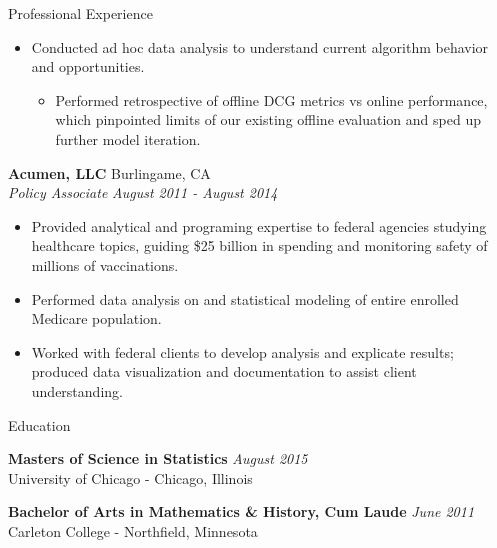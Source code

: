 \documentclass{resume} %
\begin{document}
\begin{rSection}{Professional Experience}
\begin{itemize}
\begin{itemize}
        \end{itemize}
    \item Conducted ad hoc data analysis to understand current algorithm behavior and opportunities.
        \vspace{-0.2em}
        \begin{itemize} \itemsep -0.2em
            \item Performed retrospective of offline DCG metrics vs online performance, which pinpointed limits of our existing offline evaluation and sped up further model iteration.
        \end{itemize}

\end{itemize}


{\bf Acumen, LLC} \hfill Burlingame, CA \\
{\em Policy Associate} \hfill {\em August 2011 - August 2014} \vspace{0.3em} 
\vspace{-0.2em}
\begin{itemize} \itemsep -0.2em
    \item Provided analytical and programing expertise to federal agencies studying healthcare  topics, guiding \$25 billion in spending and monitoring safety of millions of vaccinations.
    \item Performed data analysis on and statistical modeling of entire enrolled Medicare population.
    \item Worked with federal clients to develop analysis and explicate results; produced data visualization and documentation to assist client understanding. 
\end{itemize}
\end{rSection}

\vspace{0.4em}

\begin{rSection}{Education}

    {\bf Masters of Science in Statistics} \hfill {\em August 2015} \\
    University of Chicago - Chicago, Illinois \\
    \vspace{-1.2em}

    {\bf Bachelor of Arts in Mathematics \& History, Cum Laude} \hfill {\em June 2011} \\ 
    Carleton College - Northfield, Minnesota  \\
\end{rSection}
\end{document}
